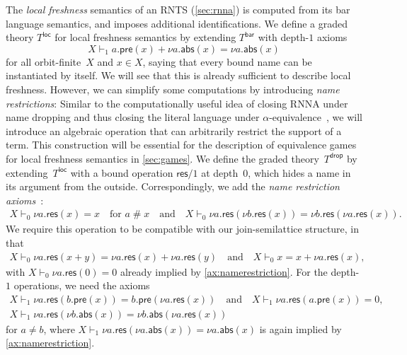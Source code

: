 \documentclass[11pt,a4paper]{amsart}
\newcommand{\Br}{\mathsf{bar}}
\newcommand{\pre}{\mathsf{pre}}
\newcommand{\abs}{\mathsf{abs}}
\newcommand{\res}{\mathsf{res}}
\newcommand{\loc}{\mathsf{loc}}
\newcommand{\drop}{\mathsf{drop}}
\newcommand{\fresh}{\mathbin{\#}}
\theoremstyle{plain}
\numberwithin{equation}{section}
\newcommand{\+}[1]{\mathcal{#1}\xspace}
\theoremstyle{definition}
\begin{document}
The \emph{local freshness} semantics of an RNTS (\cref{sec:rnna}) is
computed from its bar language semantics, and imposes additional
identifications. We define a graded theory $T^\loc$ for local
freshness semantics by extending $T^\Br$ with depth-$1$ axioms
\begin{equation}\label{ax:loc}
  X\vdash_1 a.\pre(x)+\nu a.\abs(x)=\nu a.\abs(x)
\end{equation}
for all orbit-finite~$X$ and $x\in X$, saying that every bound name
can be instantiated by itself. %
We will see that this is already sufficient to describe local
freshness.  However, we can simplify some computations by introducing
\emph{name restrictions}: Similar to the computationally useful idea
of closing RNNA under name dropping and thus closing the literal
language under $\alpha$-equivalence~\cite{SchroderEA17}, we will
introduce an algebraic operation that can arbitrarily restrict the
support of a term.  This construction will be essential for the
description of equivalence games for local freshness semantics in
\cref{sec:games}. We define the graded theory~$T^\drop$ by
extending~$T^\loc$ with a bound operation $\res/1$ at depth~$0$, which
hides a name in its argument from the outside.  Correspondingly, we
add the \emph{name restriction
  axioms}~\cite[Chapter~9]{Pitts13}: %
\begin{gather}
  X \vdash_0 \nu a.\res(x) = x \quad \text{for } a\fresh x
  \quad\text{and}\quad
  X \vdash_0 \nu a.\res(\nu b.\res(x)) = \nu b.\res(\nu a.\res(x)). \label{ax:namerestriction}
\end{gather}
We require this operation to be compatible with our join-semilattice
structure, in that
\begin{gather}
  X \vdash_0 \nu a.\res(x + y) = \nu a.\res(x) + \nu a.\res(y)
  \quad\text{and}\quad
  X \vdash_0 x = x + \nu a.\res(x), \label{ax:namerestrictionsemilattice}
\end{gather}
with $X \vdash_0 \nu a.\res(0) = 0$ already implied by \eqref{ax:namerestriction}.
For the depth-$1$ operations, we need the axioms
\begin{gather}
  X \vdash_1 \nu a.\res(b.\pre(x)) = b.\pre(\nu a.\res(x)) \quad\text{and}\quad X \vdash_1 \nu a.\res(a.\pre(x)) = 0, \label{ax:respre} \\
  X \vdash_1 \nu a.\res(\nu b.\abs(x)) = \nu b.\abs(\nu a.\res(x)) \label{ax:resabs}
\end{gather}
for $a \neq b$, where $X \vdash_1 \nu a.\res(\nu a.\abs(x)) = \nu a.\abs(x)$ is again implied by \eqref{ax:namerestriction}.
\end{document}
